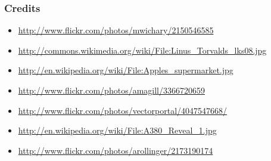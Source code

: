 \documentclass[18pt]{beamer}
\begin{document}
\begin{frame}
\frametitle{Credits}
\begin{itemize}
\item \url{http://www.flickr.com/photos/mwichary/2150546585}
\item \url{http://commons.wikimedia.org/wiki/File:Linus_Torvalds_lks08.jpg}
\item \url{http://en.wikipedia.org/wiki/File:Apples_supermarket.jpg}
\item \url{http://www.flickr.com/photos/amagill/3366720659}
\item \url{http://www.flickr.com/photos/vectorportal/4047547668/}
\item \url{http://en.wikipedia.org/wiki/File:A380_Reveal_1.jpg}
\item \url{http://www.flickr.com/photos/arollinger/2173190174}
\end{itemize}
\end{frame}
\end{document}
